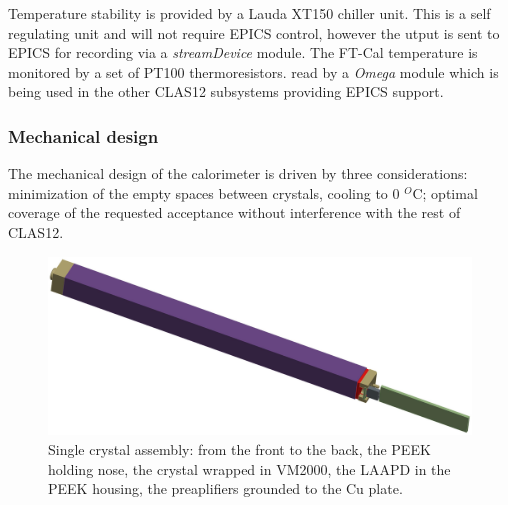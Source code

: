 Temperature stability is provided by a
Lauda XT150 chiller unit. This is a self regulating
unit and will not require EPICS control,
however the utput is sent to EPICS for recording via a
{\it streamDevice} module.
The FT-Cal temperature is 
 monitored by a set of PT100 thermoresistors.
read by a {\it Omega} module which is being used in the other CLAS12 subsystems providing EPICS support.

\subsubsection{Mechanical design}
The mechanical design of the calorimeter is
driven by three considerations: minimization of the empty spaces between
crystals, cooling to 0 $^O$C; optimal coverage of the requested acceptance without interference with the rest
of CLAS12.
\begin{figure}[th!]
\centering 
\includegraphics[width=1.0\columnwidth]{./fig/sc-assembly.eps}
\caption{Single crystal assembly: from the
front to the back, the PEEK holding nose, the
crystal wrapped in VM2000, the LAAPD in the PEEK housing,
the  preaplifiers grounded to the 
Cu plate.}
\label{fig:crystalassembly} 
\end{figure}

